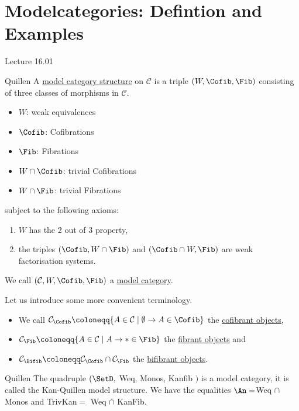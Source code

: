 \section{Modelcategories: Defintion and Examples}

Lecture 16.01

\begin{defi}{Quillen}
    A \underline{model category structure} on $\mathcal{C}$ is a triple $(W, \Cofib, \Fib)$ consisting of three classes of morphisms in $\mathcal{C}$.
    \begin{itemize}[label={}]
        \item 
        $W$: weak equivalences
        \item 
        $\Cofib$: Cofibrations
        \item  
        $\Fib$: Fibrations
        \item 
        $W \cap \Cofib$: trivial Cofibrations
        \item 
        $W \cap \Fib$: trivial Fibrations
    \end{itemize}
    subject to the following axioms:
    \begin{enumerate}
        \item 
        $W$ has the 2 out of 3 property,
        \item
        the triples $(\Cofib, W \cap \Fib)$ and $( \Cofib \cap W, \Fib)$ are weak factorisation systems.
    \end{enumerate}
    We call $(\mathcal{C}, W, \Cofib, \Fib )$ a \underline{model category}.
\end{defi}

\begin{rmk}
    Let us introduce some more convenient terminology.
    \begin{itemize}
        \item 
        We call $\mathcal{C}_{\Cofib} \coloneqq \{ A \in \mathcal{C} \mid \emptyset \to A \in \Cofib\}$ the \underline{cofibrant objects},
        \item 
        $\mathcal{C}_{\Fib} \coloneqq \{ A \in \mathcal{C} \mid A \to * \in \Fib\}$ the \underline{fibrant objects} and 
        \item   
        $\mathcal{C}_{\Bifib} \coloneqq \mathcal{C}_{\Cofib} \cap \mathcal{C}_{\Fib}$ the \underline{bifibrant objects}.
    \end{itemize}
\end{rmk}

\begin{thm}{Quillen}
    The quadruple $( \SetD ,$ Weq, Monos, Kanfib $)$ is a model category, it is called the Kan-Quillen model structure.
    We have the equalities $\An=$Weq $\cap$ Monos and TrivKan$=$ Weq $\cap$ KanFib. 
\end{thm}

